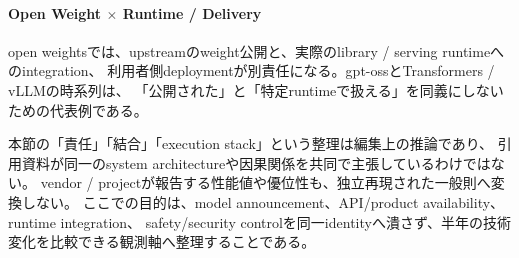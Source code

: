 \paragraph{Open Weight $\times$ Runtime / Delivery}
open weightsでは、upstreamのweight公開と、実際のlibrary / serving runtimeへのintegration、
利用者側deploymentが別責任になる。gpt-ossとTransformers / vLLMの時系列は、
「公開された」と「特定runtimeで扱える」を同義にしないための代表例である。
\cite{src-12865e8612c7,src-1c46fdf17c79,src-2595cdd4fabc,src-43eaa2f12960}

\begin{claimboundary}[横断分析の境界]
本節の「責任」「結合」「execution stack」という整理は編集上の推論であり、
引用資料が同一のsystem architectureや因果関係を共同で主張しているわけではない。
vendor / projectが報告する性能値や優位性も、独立再現された一般則へ変換しない。
ここでの目的は、model announcement、API/product availability、runtime integration、
safety/security controlを同一identityへ潰さず、半年の技術変化を比較できる観測軸へ整理することである。
\end{claimboundary}
